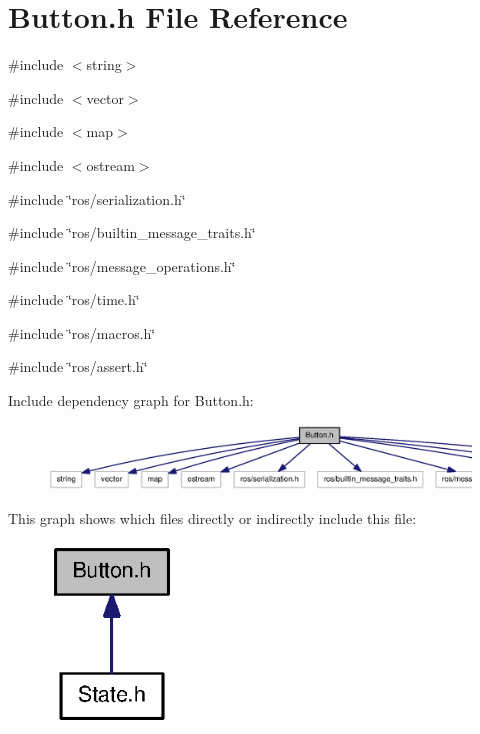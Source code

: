 \section{Button.h File Reference}
\label{Button_8h}
{\ttfamily \#include $<$string$>$}\par
{\ttfamily \#include $<$vector$>$}\par
{\ttfamily \#include $<$map$>$}\par
{\ttfamily \#include $<$ostream$>$}\par
{\ttfamily \#include \char`\"{}ros/serialization.h\char`\"{}}\par
{\ttfamily \#include \char`\"{}ros/builtin\_\-message\_\-traits.h\char`\"{}}\par
{\ttfamily \#include \char`\"{}ros/message\_\-operations.h\char`\"{}}\par
{\ttfamily \#include \char`\"{}ros/time.h\char`\"{}}\par
{\ttfamily \#include \char`\"{}ros/macros.h\char`\"{}}\par
{\ttfamily \#include \char`\"{}ros/assert.h\char`\"{}}\par
Include dependency graph for Button.h:
\nopagebreak
\begin{figure}[H]
\begin{center}
\leavevmode
\includegraphics[width=400pt]{Button_8h__incl}
\end{center}
\end{figure}
This graph shows which files directly or indirectly include this file:
\nopagebreak
\begin{figure}[H]
\begin{center}
\leavevmode
\includegraphics[width=96pt]{Button_8h__dep__incl}
\end{center}
\end{figure}
